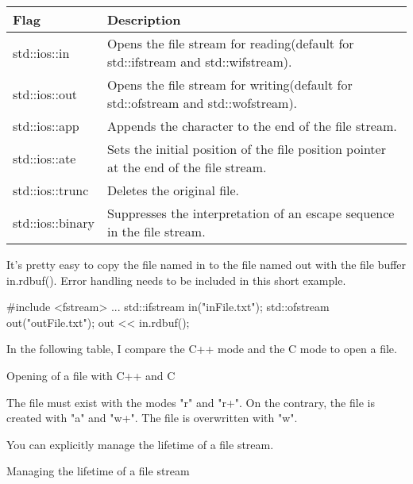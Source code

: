 \begin{longtable}[c]{|l|l|}
\hline
\textbf{Flag}    & \textbf{Description}                                                             \\ \hline
\endfirsthead
%
\endhead
%
std::ios::in     & Opens the file stream for reading(default for std::ifstream and std::wifstream). \\ \hline
std::ios::out    & Opens the file stream for writing(default for std::ofstream and std::wofstream). \\ \hline
std::ios::app    & Appends the character to the end of the file stream.                             \\ \hline
std::ios::ate & Sets the initial position of the file position pointer at the end of the file stream. \\ \hline
std::ios::trunc  & Deletes the original file.                                                       \\ \hline
std::ios::binary & Suppresses the interpretation of an escape sequence in the file stream.          \\ \hline
\end{longtable}

It’s pretty easy to copy the file named in to the file named out with the file buffer in.rdbuf(). Error handling needs to be included in this short example.

\begin{cpp}
#include <fstream>
...
std::ifstream in("inFile.txt");
std::ofstream out("outFile.txt");
out << in.rdbuf();
\end{cpp}

In the following table, I compare the C++ mode and the C mode to open a file.

\begin{center}
Opening of a file with C++ and C
\end{center}



The file must exist with the modes "r" and "r+". On the contrary, the file is created with "a" and "w+". The file is overwritten with "w".

You can explicitly manage the lifetime of a file stream.

\begin{center}
Managing the lifetime of a file stream
\end{center}

